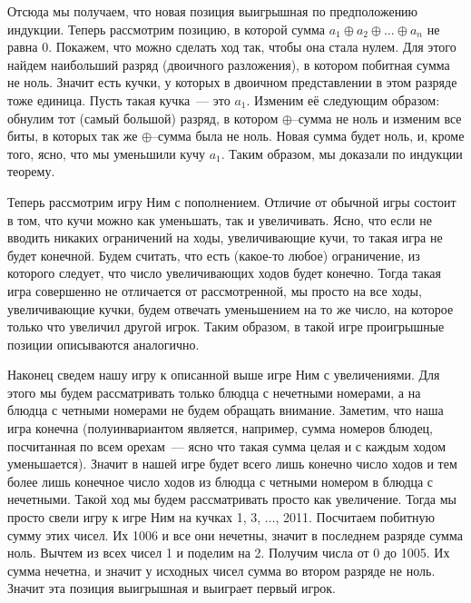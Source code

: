 Отсюда мы получаем, что новая позиция выигрышная по предположению индукции.
Теперь рассмотрим позицию, в которой сумма
$a_1 \oplus a_2 \oplus \ldots \oplus a_n$ не равна 0.
Покажем, что можно сделать ход так, чтобы она стала нулем.
Для этого найдем наибольший разряд (двоичного разложения), в котором побитная
сумма не ноль.
Значит есть кучки, у которых в двоичном представлении в этом разряде тоже
единица.
Пусть такая кучка~--- это $a_1$.
Изменим её следующим образом: обнулим тот (самый большой) разряд, в котором
$\oplus$--сумма не ноль и изменим все биты, в которых так же $\oplus$--сумма
была не ноль.
Новая сумма будет ноль, и, кроме того, ясно, что мы уменьшили кучу $a_1$.
Таким образом, мы доказали по индукции теорему.
\par
Теперь рассмотрим игру Ним с пополнением.
Отличие от обычной игры состоит в том, что кучи можно как уменьшать, так и
увеличивать.
Ясно, что если не вводить никаких ограничений на ходы, увеличивающие кучи, то
такая игра не будет конечной.
Будем считать, что есть (какое-то любое) ограничение, из которого следует, что
число увеличивающих ходов будет конечно.
Тогда такая игра совершенно не отличается от рассмотренной, мы просто на все
ходы, увеличивающие кучки, будем отвечать уменьшением на то же число, на
которое только что увеличил другой игрок.
Таким образом, в такой игре проигрышные позиции описываются аналогично.
\par
Наконец сведем нашу игру к описанной выше игре Ним с увеличениями.
Для этого мы будем рассматривать только блюдца с нечетными номерами, а на
блюдца с четными номерами не будем обращать внимание.
Заметим, что наша игра конечна
(полуинвариантом является, например, сумма номеров блюдец, посчитанная по всем
орехам~--- ясно что такая сумма целая и с каждым ходом уменьшается).
Значит в нашей игре будет всего лишь конечно число ходов и тем более лишь
конечное число ходов из блюдца с четными номером в блюдца с нечетными.
Такой ход мы будем рассматривать просто как увеличение.
Тогда мы просто свели игру к игре Ним на кучках 1, 3, $\ldots$, 2011.
Посчитаем побитную сумму этих чисел.
Их 1006 и все они нечетны, значит в последнем разряде сумма ноль.
Вычтем из всех чисел 1 и поделим на 2.
Получим числа от 0 до 1005.
Их сумма нечетна, и значит у исходных чисел сумма во втором разряде не ноль.
Значит эта позиция выигрышная и выиграет первый игрок.

\endproblem
